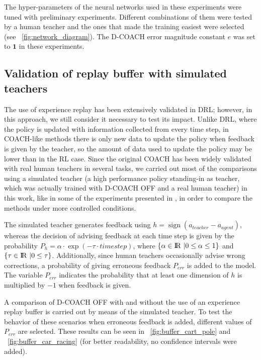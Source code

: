 The hyper-parameters of the neural networks used in these experiments were tuned with preliminary experiments. Different combinations of them were tested by a human teacher and the ones that made the training easiest were selected (see \figurename~{\ref{fig:network_diagram}}). The D-COACH error magnitude constant $e$ was set to $\textbf{1}$ in these experiments.

\subsection{Validation of replay buffer with simulated teachers}
The use of experience replay has been extensively validated in DRL; however, in this approach, we  still consider it necessary to test its impact. Unlike DRL, where the policy is updated with information collected from every time step, in COACH-like methods there is only new data to update the policy when feedback is given by the teacher, so the amount of data used to update the policy may be lower than in the RL case. Since the original COACH has been widely validated with real human teachers in several tasks, we carried out most of the comparisons using  a simulated teacher (a high performance policy standing-in as teacher, which was actually trained with D-COACH OFF and a real human teacher) in this work, like in some of the experiments presented in \cite{Celemin2018AnInteractive}, in order to compare the methods under more controlled conditions. 

The simulated teacher generates feedback using $h = \operatorname{sign}(a_{\mathit{teacher}} - a_{\mathit{agent}})$, whereas the decision of advising feedback at each time step is given by the probability $P_{h} = \alpha \cdot\exp(-\tau\cdot \mathit{timestep})$, where $\{\alpha \in {\rm I\!R}\ | 0 \le \alpha \le 1\}$ and $\{\tau \in {\rm I\!R}\ | 0 \le \tau\}$. Additionally, since human teachers occasionally advise wrong corrections, a probability of giving erroneous feedback $P_{\mathit{err}}$ is added to the model. The variable $P_{\mathit{err}}$ indicates the probability that at least one dimension of $h$ is multiplied by $-1$ when feedback is given.

A comparison of D-COACH OFF with and without the use of an experience replay buffer is carried out by means of the simulated teacher. To test the behavior of these scenarios when erroneous feedback is added, different values of $P_{\mathit{err}}$ are selected. These results can be seen in \figurename~{\ref{fig:buffer_cart_pole}} and \figurename~{\ref{fig:buffer_car_racing}} (for better readability, no confidence intervals were added).

